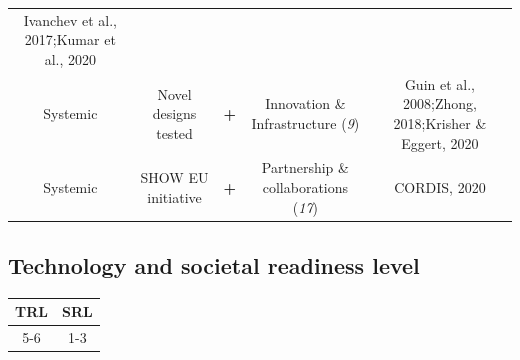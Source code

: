 \documentclass[
]{book}
\begin{document}
\begin{longtable}[]{@{}ccccc@{}}
\begin{minipage}[t]{0.17\columnwidth}
Ivanchev et al., 2017;Kumar et al., 2020\strut
\end{minipage}\tabularnewline
\begin{minipage}[t]{0.17\columnwidth}\centering
Systemic\strut
\end{minipage} & \begin{minipage}[t]{0.16\columnwidth}\centering
Novel designs tested\strut
\end{minipage} & \begin{minipage}[t]{0.17\columnwidth}\centering
\textbf{+}\strut
\end{minipage} & \begin{minipage}[t]{0.17\columnwidth}\centering
Innovation \& Infrastructure (\emph{9})\strut
\end{minipage} & \begin{minipage}[t]{0.17\columnwidth}\centering
Guin et al., 2008;Zhong, 2018;Krisher \& Eggert, 2020\strut
\end{minipage}\tabularnewline
\begin{minipage}[t]{0.17\columnwidth}\centering
Systemic\strut
\end{minipage} & \begin{minipage}[t]{0.16\columnwidth}\centering
SHOW EU initiative\strut
\end{minipage} & \begin{minipage}[t]{0.17\columnwidth}\centering
\textbf{+}\strut
\end{minipage} & \begin{minipage}[t]{0.17\columnwidth}\centering
Partnership \& collaborations (\emph{17})\strut
\end{minipage} & \begin{minipage}[t]{0.17\columnwidth}\centering
CORDIS, 2020\strut
\end{minipage}\tabularnewline
\bottomrule
\end{longtable}

\hypertarget{technology-and-societal-readiness-level}{%
\subsection*{Technology and societal readiness level}\label{technology-and-societal-readiness-level}}

\begin{longtable}[]{@{}cc@{}}
\toprule
TRL & SRL\tabularnewline
\midrule
\endhead
5-6 & 1-3\tabularnewline
\bottomrule
\end{longtable}
\end{document}
